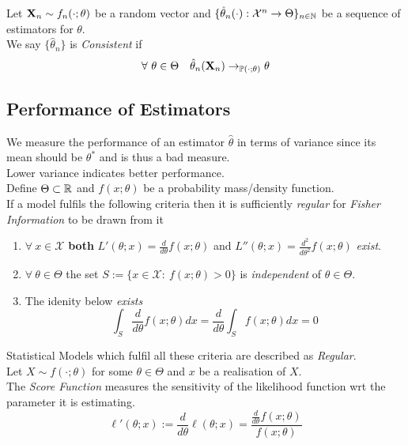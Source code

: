 \documentclass[11pt,a4paper]{article}
\begin{document}
Let $\textbf{X}_n\sim f_n(\cdot;\theta)$ be a random vector and $\{\hat\theta_n(\cdot):\mathcal{X}^n\to\Theta\}_{n\in\mathbb{N}}$ be a sequence of estimators for $\theta$.\\
We say $\{\hat\theta_n\}$ is \textit{Consistent} if
$$\forall\ \theta\in\Theta\quad\hat\theta_n(\X_n)\to_{\prob(\cdot;\theta)}\theta$$


\subsection{Performance of Estimators}

We measure the performance of an estimator $\hat\theta$ in terms of variance since its mean should be $\theta^*$ and is thus a bad measure.\\
Lower variance indicates better performance.\\

Define $\Theta\subset\mathbb{R}$ and $f(x;\theta)$ be a probability mass/density function.\\
If a model fulfils the following criteria then it is sufficiently \textit{regular} for \textit{Fisher Information} to be drawn from it
\begin{enumerate}[label=\roman*)]
	\item $\forall\ x\in\mathcal{X}$ \textbf{both} $L'(\theta;x)=\frac{d}{d\theta}f(x;\theta)$ and $L''(\theta;x)=\frac{d^2}{d\theta^2}f(x;\theta)$ \textit{exist}.
	\item $\forall\ \theta\in\Theta$ the set $S:=\{x\in\mathcal{X}:\ f(x;\theta)>0\}$ is \textit{independent} of $\theta\in\Theta$.
	\item The idenity below \textit{exists}
	$$\int_S\frac{d}{d\theta}f(x;\theta)dx=\frac{d}{d\theta}\int_Sf(x;\theta)dx=0$$
\end{enumerate}
\nb Statistical Models which fulfil all these criteria are described as \textit{Regular}.\\

Let $X\sim f(\cdot;\theta)$ for some $\theta\in\Theta$ and $x$ be a realisation of $X$.\\
The \textit{Score Function} measures the sensitivity of the likelihood function  wrt the parameter it is estimating.
$$\ell'(\theta;x):=\frac{d}{d\theta}\ell(\theta;x)=\frac{\frac{d}{d\theta}f(x;\theta)}{f(x;\theta)}$$
\end{document}
